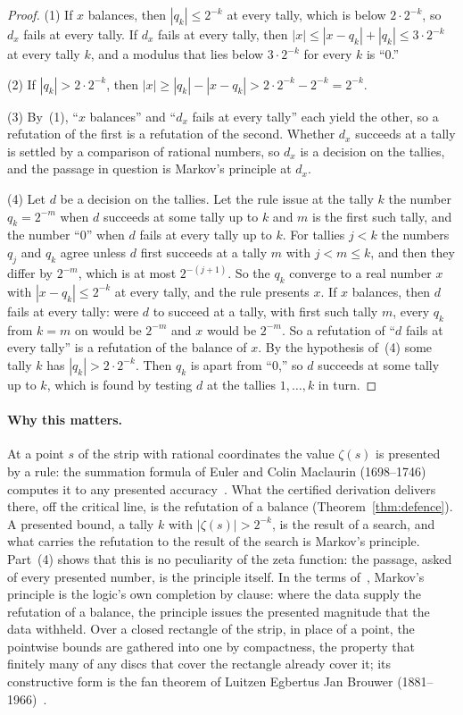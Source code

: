 \documentclass[11pt]{article}
\theoremstyle{definition}
\theoremstyle{remark}
\begin{document}
\begin{proof}
(1) If $x$ balances, then $|q_k|\le2^{-k}$ at every tally, which is below $2\cdot2^{-k}$, so $d_x$ fails at every tally. If $d_x$ fails at every tally, then $|x|\le|x-q_k|+|q_k|\le3\cdot2^{-k}$ at every tally $k$, and a modulus that lies below $3\cdot2^{-k}$ for every $k$ is ``0.''

(2) If $|q_k|>2\cdot2^{-k}$, then $|x|\ge|q_k|-|x-q_k|>2\cdot2^{-k}-2^{-k}=2^{-k}$.

(3) By~(1), ``$x$ balances'' and ``$d_x$ fails at every tally'' each yield the other, so a refutation of the first is a refutation of the second. Whether $d_x$ succeeds at a tally is settled by a comparison of rational numbers, so $d_x$ is a decision on the tallies, and the passage in question is Markov's principle at $d_x$.

(4) Let $d$ be a decision on the tallies. Let the rule issue at the tally $k$ the number $q_k=2^{-m}$ when $d$ succeeds at some tally up to $k$ and $m$ is the first such tally, and the number ``0'' when $d$ fails at every tally up to $k$. For tallies $j<k$ the numbers $q_j$ and $q_k$ agree unless $d$ first succeeds at a tally $m$ with $j<m\le k$, and then they differ by $2^{-m}$, which is at most $2^{-(j+1)}$. So the $q_k$ converge to a real number $x$ with $|x-q_k|\le2^{-k}$ at every tally, and the rule presents $x$. If $x$ balances, then $d$ fails at every tally: were $d$ to succeed at a tally, with first such tally $m$, every $q_k$ from $k=m$ on would be $2^{-m}$ and $x$ would be $2^{-m}$. So a refutation of ``$d$ fails at every tally'' is a refutation of the balance of $x$. By the hypothesis of~(4) some tally $k$ has $|q_k|>2\cdot2^{-k}$. Then $q_k$ is apart from ``0,'' so $d$ succeeds at some tally up to $k$, which is found by testing $d$ at the tallies $1,\dots,k$ in turn.
\end{proof}

\paragraph{Why this matters.} At a point $s$ of the strip with rational coordinates the value $\zeta(s)$ is presented by a rule: the summation formula of Euler and Colin Maclaurin (1698--1746) computes it to any presented accuracy~\citep[ch.~6]{edwards}. What the certified derivation delivers there, off the critical line, is the refutation of a balance (Theorem~\ref{thm:defence}). A presented bound, a tally $k$ with $|\zeta(s)|>2^{-k}$, is the result of a search, and what carries the refutation to the result of the search is Markov's principle. Part~(4) shows that this is no peculiarity of the zeta function: the passage, asked of every presented number, is the principle itself. In the terms of~\citet{tv}, Markov's principle is the logic's own completion by clause: where the data supply the refutation of a balance, the principle issues the presented magnitude that the data withheld. Over a closed rectangle of the strip, in place of a point, the pointwise bounds are gathered into one by compactness, the property that finitely many of any discs that cover the rectangle already cover it; its constructive form is the fan theorem of Luitzen Egbertus Jan Brouwer (1881--1966)~\citep{dummett}.
\end{document}
